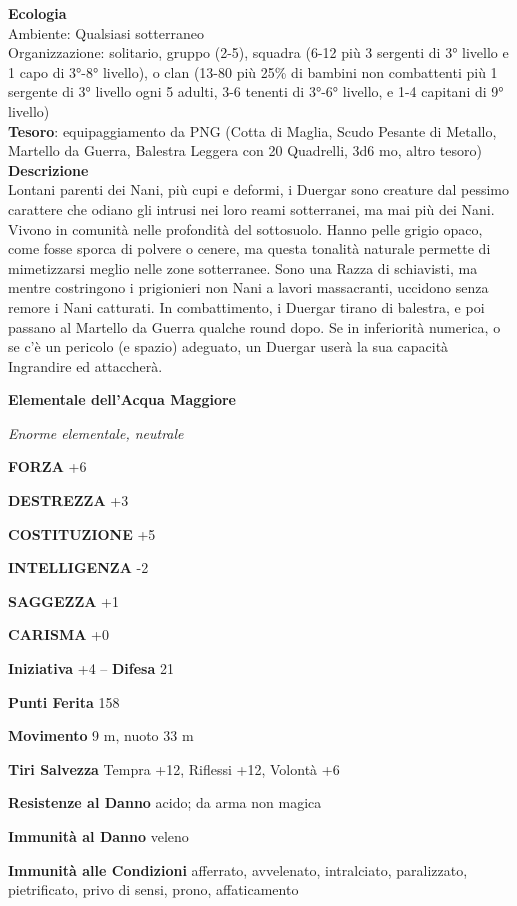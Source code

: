 \begin{multicols}{2}
	\textbf{Ecologia}\\
	Ambiente: Qualsiasi sotterraneo\\
	Organizzazione: solitario, gruppo (2-5), squadra (6-12 più 3 sergenti di 3° livello e 1 capo di 3°-8° livello), o clan (13-80 più 25\% di bambini non combattenti più 1 sergente di 3° livello ogni 5 adulti, 3-6 tenenti di 3°-6° livello, e 1-4 capitani di 9° livello)\\
	\textbf{Tesoro}: equipaggiamento da PNG (Cotta di Maglia, Scudo Pesante di Metallo, Martello da Guerra, Balestra Leggera con 20 Quadrelli, 3d6 mo, altro tesoro)\\
	\textbf{Descrizione}\\
	Lontani parenti dei Nani, più cupi e deformi, i Duergar sono creature dal pessimo carattere che odiano gli intrusi nei loro reami sotterranei, ma mai più dei Nani. Vivono in comunità nelle profondità del sottosuolo. Hanno pelle grigio opaco, come fosse sporca di polvere o cenere, ma questa tonalità naturale permette di mimetizzarsi meglio nelle zone sotterranee. Sono una Razza di schiavisti, ma mentre costringono i prigionieri non Nani a lavori massacranti, uccidono senza remore i Nani catturati. In combattimento, i Duergar tirano di balestra, e poi passano al Martello da Guerra qualche round dopo. Se in inferiorità numerica, o se c'è un pericolo (e spazio) adeguato, un Duergar userà la sua capacità Ingrandire ed attaccherà.

	\medskip{}\textbf{Elementale dell'Acqua Maggiore}

	\textit{Enorme elementale, neutrale}

	\textbf{FORZA} +6

	\textbf{DESTREZZA} +3

	\textbf{COSTITUZIONE} +5

	\textbf{INTELLIGENZA} -2

	\textbf{SAGGEZZA} +1

	\textbf{CARISMA} +0

	\textbf{Iniziativa} +4 -- \textbf{Difesa} 21

	\textbf{Punti Ferita} 158

	\textbf{Movimento} 9 m, nuoto 33 m

	\textbf{Tiri Salvezza} Tempra +12, Riflessi +12, Volontà +6

	\textbf{Resistenze al Danno} acido; da arma non magica

	\textbf{Immunità al Danno} veleno

	\textbf{Immunità alle Condizioni} afferrato, avvelenato, intralciato, paralizzato, pietrificato, privo di sensi, prono, affaticamento


\end{multicols}
